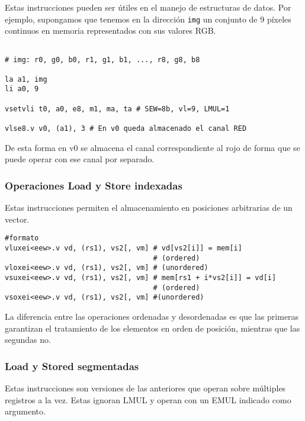 Estas instrucciones pueden ser útiles en el manejo de estructuras de datos. Por
ejemplo, supongamos que tenemos en la dirección \texttt{img} un conjunto de 9
píxeles continuos en memoria representados con sus valores RGB.

\begin{lstlisting}

# img: r0, g0, b0, r1, g1, b1, ..., r8, g8, b8

la a1, img
li a0, 9

vsetvli t0, a0, e8, m1, ma, ta # SEW=8b, vl=9, LMUL=1

vlse8.v v0, (a1), 3 # En v0 queda almacenado el canal RED

\end{lstlisting}

De esta forma en v0 se almacena el canal correspondiente al rojo de forma que
se puede operar con ese canal por separado.

\subsubsection{Operaciones Load y Store indexadas}
Estas instrucciones permiten el almacenamiento en posiciones arbitrarias de un vector.

\begin{lstlisting}
#formato
vluxei<eew>.v vd, (rs1), vs2[, vm] # vd[vs2[i]] = mem[i]
                                   # (ordered)
vloxei<eew>.v vd, (rs1), vs2[, vm] # (unordered)
vsuxei<eew>.v vd, (rs1), vs2[, vm] # mem[rs1 + i*vs2[i]] = vd[i] 
                                   # (ordered)
vsoxei<eew>.v vd, (rs1), vs2[, vm] #(unordered)
\end{lstlisting}

La diferencia entre las operaciones ordenadas y desordenadas es que las
primeras garantizan el tratamiento de los elementos en orden de posición,
mientras que las segundas no.

\subsubsection{Load y Stored segmentadas}
Estas instrucciones son versiones de las anteriores que operan sobre múltiples
registros a la vez. Estas ignoran LMUL y operan con un EMUL indicado como
argumento.

